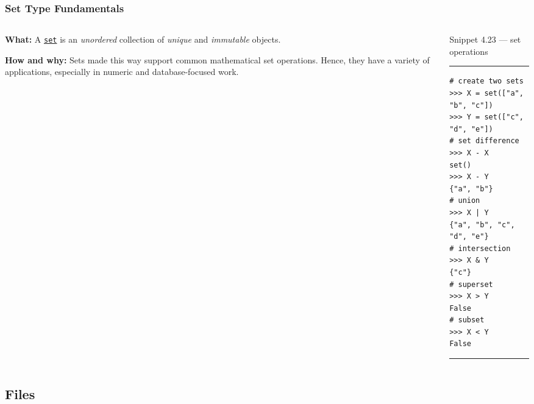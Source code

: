 \documentclass[aspectratio=1610]{beamer}
\begin{document}
\begin{frame}[fragile]
    \frametitle{Set Type Fundamentals}
\begin{columns}
    \begin{column}{0.45\textwidth}
    \quad \textbf{What:} 
    A \href{https://docs.python.org/3/tutorial/datastructures.html\#sets}{\texttt{set}} is an \emph{unordered} collection of \emph{unique} and \emph{immutable} objects.
    \vspace{1em}
    
    \quad \textbf{How and why:}
    Sets made this way support common mathematical set operations. Hence, they have a variety of applications, especially in numeric and database-focused work.
    \end{column}
    \begin{column}{0.45\textwidth}
        Snippet 4.23 --- set operations
    \rule{\textwidth}{1pt}
        \scriptsize
        \begin{verbatim}          
# create two sets 
>>> X = set(["a", "b", "c"])
>>> Y = set(["c", "d", "e"])
# set difference 
>>> X - X
set()
>>> X - Y
{"a", "b"}
# union
>>> X | Y
{"a", "b", "c", "d", "e"}
# intersection
>>> X & Y
{"c"}
# superset
>>> X > Y
False
# subset
>>> X < Y
False
        \end{verbatim}
    \rule{\textwidth}{1pt}
    \end{column}
\end{columns}
\end{frame}

\subsection{Files}
\end{document}
